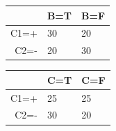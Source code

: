 \documentclass[11pt]{article}
\begin{document}
\begin{table}[H]
	\centering
\begin{tabular}{|r|l|l|}
  & B=T & B=F \\
\hline
     C1=+ &  30    & 20 \\
     C2=-   &  20    & 30 \\
\end{tabular}
\end{table}

\begin{table}[H]
	\centering
\begin{tabular}{|r|l|l|}
  & C=T & C=F \\
\hline
     C1=+ &  25    & 25 \\
     C2=-   &  30    & 20 \\
\end{tabular}
\end{table}
\end{document}

